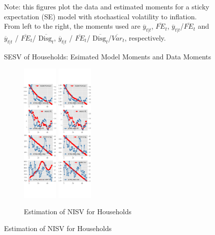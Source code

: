 \documentclass[]{article}
\begin{document}
\begin{figure}[ht]
\begin{subfigure}[b]{\textwidth}
	\end{subfigure}
	\begin{flushleft}
		{\footnotesize Note: this figures plot the data and estimated moments for a  sticky expectation (SE) model with stochastical volatility to inflation. From left to the right, the moments used are $\overline y_{t|t}$, $\overline{FE}_{t}$, $\overline y_{t|t}$/$\overline{FE}_{t}$ and $\overline y_{t|t}$ / $\overline{FE}_{t}$/ $\overline{\textrm{Disg}_t}$, $\overline y_{t|t}$ / $\overline{FE}_{t}$/ $\overline{\textrm{Disg}_t}$/$\overline{Var}_t$,  respectively. }
	\end{flushleft}
	\caption{SESV of Households: Esimated Model Moments and Data Moments}
\end{figure}


\begin{figure}[ht]
	\centering
	\begin{subfigure}[b]{\textwidth}
		\centering
		\caption{Estimation of NISV for Households}
		\label{NISV_diag_SCE}
		\includegraphics[width=0.19\textwidth]{figures/sce_ni_est_sv_diag0.png}
		\includegraphics[width=0.19\textwidth]{figures/sce_ni_est_sv_diag1.png}

\end{subfigure}
\end{figure}
\end{document}
